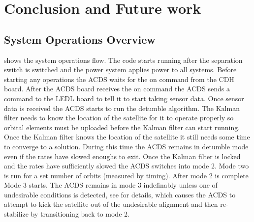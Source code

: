 
\chapter{Conclusion and Future work}

\section{System Operations Overview}

 shows the system operations flow. The code starts running after the separation switch is switched and the power system applies power to all systems. Before starting any operations the \ac{ACDS} waits for the on command from the \ac{CDH} board. After the \ac{ACDS} board receives the on command the \ac{ACDS} sends a command to the \ac{LEDL} board to tell it to start taking sensor data. Once sensor data is received the \ac{ACDS} starts to run the detumble algorithm. The Kalman filter needs to know the location of the satellite for it to operate properly so orbital elements must be uploaded before the Kalman filter can start running. Once the Kalman filter knows the location of the satellite it still needs some time to converge to a solution. During this time the \ac{ACDS} remains in detumble mode even if the rates have slowed enoughs to exit. Once the Kalman filter is locked and the rates have sufficiently slowed the \ac{ACDS} switches into mode 2. Mode two is run for a set number  of orbits (measured by timing). After mode 2 is complete Mode 3 starts. The \ac{ACDS} remains in mode 3 indefinably unless one of undesirable conditions is detected, see \cite{Mentch11} for details, which causes the \ac{ACDS} to attempt to kick the satellite out of the undesirable alignment and then re-stabilize by transitioning back to mode 2.

